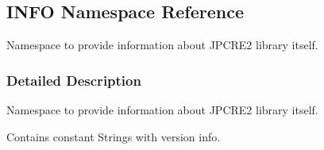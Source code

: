 \hypertarget{namespaceINFO}{}\subsection{I\+N\+FO Namespace Reference}
\label{namespaceINFO}


Namespace to provide information about J\+P\+C\+R\+E2 library itself.  




\subsubsection{Detailed Description}
Namespace to provide information about J\+P\+C\+R\+E2 library itself. 

Contains constant Strings with version info. 